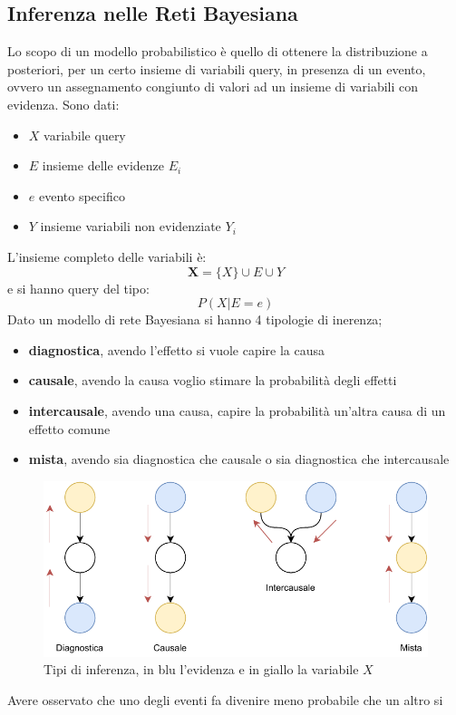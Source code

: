 \message{ !name(modprob.tex)}\documentclass[a4paper,12pt, oneside]{book}
\begin{document}
\subsection{Inferenza nelle Reti Bayesiana}
Lo scopo di un modello probabilistico è quello di ottenere la distribuzione a
posteriori, per un certo insieme di variabili query, in presenza di un evento,
ovvero un assegnamento congiunto di valori ad un insieme di variabili con
evidenza. Sono dati:
\begin{itemize}
  \item $X$ variabile query
  \item $E$ insieme delle evidenze $E_i$
  \item $e$ evento specifico
  \item $Y$ insieme variabili non evidenziate $Y_i$
\end{itemize}
L'insieme completo delle variabili è:
\[\mathbf{X}=\{X\}\cup E\cup Y\]
e si hanno query del tipo:
\[P(X|E=e)\]
Dato un modello di rete Bayesiana si hanno 4 tipologie di inerenza;
\begin{itemize}
  \item \textbf{diagnostica}, avendo l'effetto si vuole capire la causa
  \item \textbf{causale}, avendo la causa voglio stimare la probabilità degli
  effetti 
  \item \textbf{intercausale}, avendo una causa, capire
  la probabilità un'altra causa di un effetto comune
  \item \textbf{mista}, avendo sia diagnostica che causale o sia diagnostica che
  intercausale 
\end{itemize}
\begin{figure}
  \centering
  \includegraphics[scale = 0.8]{img/inf.pdf}
  \caption{Tipi di inferenza, in blu l'evidenza e in giallo la variabile $X$}
\end{figure}
Avere osservato che uno degli eventi fa divenire meno probabile che un altro si
\end{document}
